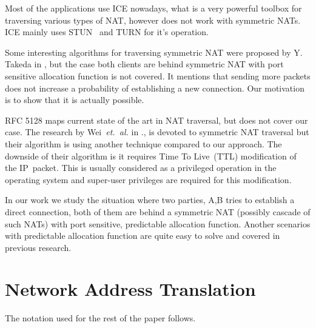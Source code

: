 \documentclass[twoside]{article}
\newcommand{\ignore}[1]{}
\begin{document}
\begin{multicols}{2}
Most of the applications use ICE\ignore{~\citep{rfc5245}} nowadays, what is a very powerful toolbox for traversing 
various types of NAT, however does not work with symmetric NATs. ICE mainly uses STUN~\citep{rfc5389} and TURN\ignore{~\citep{rfc5766}} for it's operation.

Some interesting algorithms for traversing symmetric NAT were proposed by Y. Takeda in \citep{takeda}, but the case both clients are behind symmetric NAT
with port sensitive allocation function is not covered. It mentions that sending more packets does not increase a probability of establishing a new connection.
Our motivation is to show that it is actually possible.

RFC 5128 \citep{rfc5128} maps current state of the art in NAT traversal, but does not cover our case. 
The research by Wei~\emph{et.~al.} in \citep{wei}., is devoted to symmetric NAT traversal but their algorithm is using another technique compared
to our approach. The downside of their algorithm is it requires Time To Live~(TTL) modification of the IP~packet. This is usually considered
as a privileged operation in the operating system and super-user privileges are required for this modification. 

In our work we study the situation where two parties, A,B tries to establish a direct connection, both of them are behind 
a symmetric NAT (possibly cascade of such NATs) with port sensitive, predictable allocation function. Another scenarios with
predictable allocation function are quite easy to solve and covered in previous research. 

\section{Network Address Translation}
The notation used for the rest of the paper follows.



\end{multicols}
\end{document}

